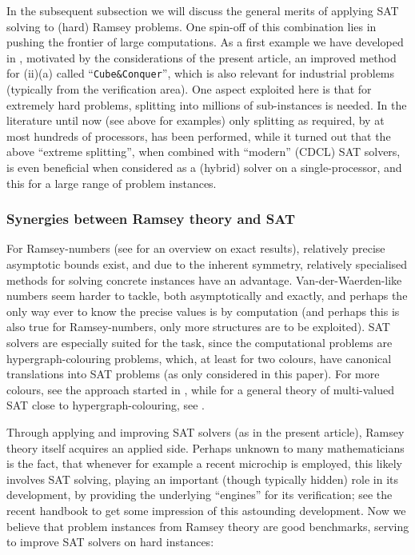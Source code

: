 \documentclass[final,3p,times]{elsarticle}
\theoremstyle{definition}
\newcommand{\cubeconq}{\texttt{Cube\:\&\:Conquer}}
\begin{document}
In the subsequent subsection we will discuss the general merits of applying SAT solving to (hard) Ramsey problems. One spin-off of this combination lies in pushing the frontier of large computations. As a first example we have developed in \cite{HeuleKullmannWieringaBiere2011Cubism,TakHeuleBiere2012CC}, motivated by the considerations of the present article, an improved method for (ii)(a) called ``\cubeconq'', which is also relevant for industrial problems (typically from the verification area). One aspect exploited here is that for extremely hard problems, splitting into millions of sub-instances is needed. In the literature until now (see above for examples) only splitting as required, by at most hundreds of processors, has been performed, while it turned out that the above ``extreme splitting'', when combined with ``modern'' (CDCL) SAT solvers, is even beneficial when considered as a (hybrid) solver on a single-processor, and this for a large range of problem instances.




\subsubsection{Synergies between Ramsey theory and SAT}
\label{sec:merits}

For Ramsey-numbers (see \cite{Radziszowski2006RamseySurvey} for an overview on exact results),
relatively precise asymptotic bounds exist, and due to the inherent symmetry, relatively
specialised methods for solving concrete instances have an advantage. Van-der-Waerden-like numbers
seem harder to tackle, both asymptotically and exactly, and perhaps the only way ever to know the
precise values is by computation (and perhaps this is also true for Ramsey-numbers,
only more structures are to be exploited). SAT solvers are especially suited for the task,
since the computational problems are hypergraph-colouring problems, which, at least for two colours,
have canonical translations into SAT problems (as only considered in this paper).
For more colours, see the approach started in \cite{kullmann}, while for a general theory of multi-valued SAT close to
hypergraph-colouring, see \cite{Kullmann2007ClausalFormZI,Kullmann2007ClausalFormZII}.

Through applying and improving SAT solvers (as in the present article), Ramsey theory itself acquires an applied side.
Perhaps unknown to many mathematicians is the fact, that whenever for example a recent microchip is employed, this likely involves SAT solving, playing an important (though typically hidden) role in its development, by providing the underlying ``engines'' for its verification; see the recent handbook \cite{2008HandbuchSAT} to get some impression of this astounding development.
Now we believe that problem instances from Ramsey theory are good benchmarks, serving to improve SAT solvers on hard instances:
\end{document}
